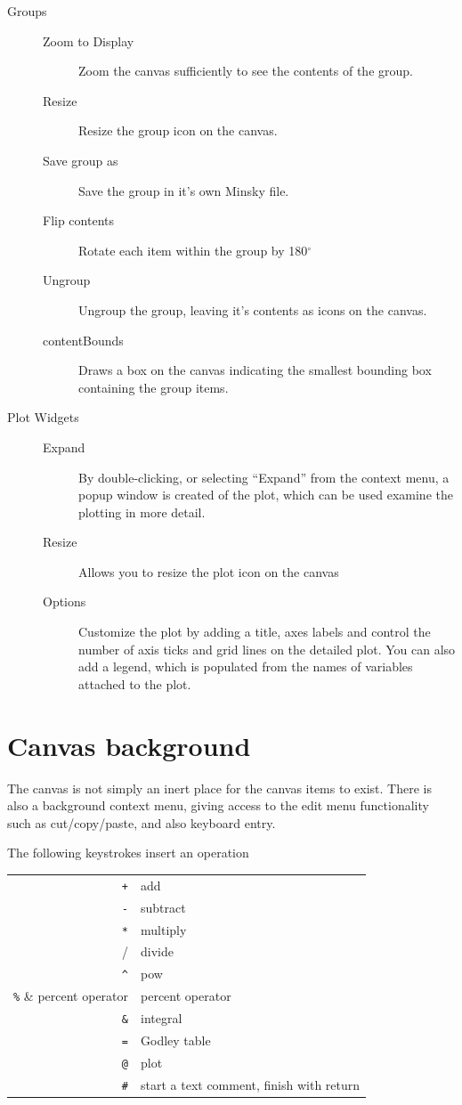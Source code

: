 \begin{description}
\item[Groups]\mbox{}
  \begin{description}
  \item[Zoom to Display] Zoom the canvas sufficiently to see the
    contents of the group.
  \item[Resize] Resize the group icon on the canvas.
  \item[Save group as] Save the group in it's own Minsky file.
  \item[Flip contents] Rotate each item within the group by
    180$^\circ$
  \item[Ungroup] Ungroup the group, leaving it's contents as icons on
    the canvas.
  \item[contentBounds] Draws a box on the canvas indicating the
    smallest bounding box containing the group items.
  \end{description}
        

\item[Plot Widgets]\mbox{}
  \begin{description}
  \item[Expand] By double-clicking, or selecting ``Expand'' from the
    context menu, a popup window is created of the plot, which can be
    used examine the plotting in more detail.
          
  \item[Resize] Allows you to resize the plot icon on the canvas
  \item[Options] Customize the plot by adding a title, axes labels and
    control the number of axis ticks and grid lines on the detailed
    plot. You can also add a legend, which is populated from the names
    of variables attached to the plot.
  \end{description}
        
\end{description}

\section{Canvas background}

The canvas is not simply an inert place for the canvas items to
exist. There is also a background context menu, giving access to the
edit menu functionality such as cut/copy/paste, and also keyboard
entry.

The following keystrokes insert an operation

\begin{tabular}{rl}
  \verb-+- & add\\
  \verb+-+ & subtract \\
  \verb+*+ & multiply\\
  \verb++/ & divide\\
  \verb+^+ & pow\\
  \verb+%+ & percent operator\\
  \verb+&+ & integral\\
  \verb+=+ & Godley table\\
  \verb+@+ & plot\\
  \verb+#+ & start a text comment, finish with return\\
\end{tabular}

